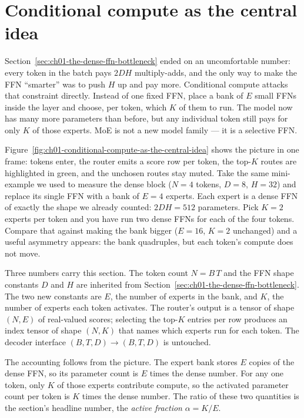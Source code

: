 \section{Conditional compute as the central idea}
\label{sec:ch01-conditional-compute-as-the-central-idea}

Section~\ref{sec:ch01-the-dense-ffn-bottleneck} ended on an uncomfortable number: every token in the batch pays $2 D H$ multiply-adds, and the only way to make the FFN ``smarter'' was to push $H$ up and pay more. Conditional compute attacks that constraint directly. Instead of one fixed FFN, place a bank of $E$ small FFNs inside the layer and choose, per token, which $K$ of them to run. The model now has many more parameters than before, but any individual token still pays for only $K$ of those experts. MoE is not a new model family --- it is a selective FFN.



Figure~\ref{fig:ch01-conditional-compute-as-the-central-idea} shows the picture in one frame: tokens enter, the router emits a score row per token, the top-$K$ routes are highlighted in green, and the unchosen routes stay muted. Take the same mini-example we used to measure the dense block ($N = 4$ tokens, $D = 8$, $H = 32$) and replace its single FFN with a bank of $E = 4$ experts. Each expert is a dense FFN of exactly the shape we already counted: $2 D H = 512$ parameters. Pick $K = 2$ experts per token and you have run two dense FFNs for each of the four tokens. Compare that against making the bank bigger ($E = 16$, $K = 2$ unchanged) and a useful asymmetry appears: the bank quadruples, but each token's compute does not move.

Three numbers carry this section. The token count $N = B\,T$ and the FFN shape constants $D$ and $H$ are inherited from Section~\ref{sec:ch01-the-dense-ffn-bottleneck}. The two new constants are $E$, the number of experts in the bank, and $K$, the number of experts each token activates. The router's output is a tensor of shape $(N, E)$ of real-valued scores; selecting the top-$K$ entries per row produces an index tensor of shape $(N, K)$ that names which experts run for each token. The decoder interface $(B, T, D) \to (B, T, D)$ is untouched.



The accounting follows from the picture. The expert bank stores $E$ copies of the dense FFN, so its parameter count is $E$ times the dense number. For any one token, only $K$ of those experts contribute compute, so the activated parameter count per token is $K$ times the dense number. The ratio of these two quantities is the section's headline number, the \emph{active fraction} $\alpha = K/E$.

